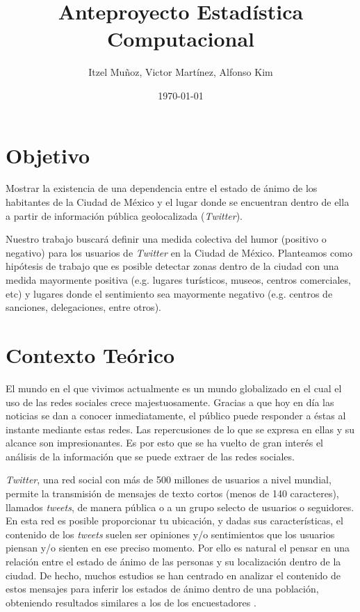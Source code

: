 \documentclass{article}
\author{Itzel Muñoz, Victor Martínez, Alfonso Kim}
\date{\today}
\title{Anteproyecto Estadística Computacional}
\begin{document}
\maketitle

	\section{Objetivo}
		Mostrar la existencia de una dependencia entre el estado de ánimo de los habitantes de la Ciudad de México y el lugar donde se encuentran dentro de ella a partir de información pública geolocalizada (\emph{Twitter}).

		Nuestro trabajo buscará definir una medida colectiva del humor (positivo o negativo) para los usuarios de \emph{Twitter} en la Ciudad de México. Planteamos como hipótesis de trabajo que es posible detectar zonas dentro de la ciudad con una medida mayormente positiva (e.g. lugares turísticos, museos, centros comerciales, etc) y lugares donde el sentimiento sea mayormente negativo (e.g. centros de sanciones, delegaciones, entre otros). 


	\section{Contexto Teórico}
		El mundo en el que vivimos actualmente es un mundo globalizado en el cual el uso de las redes sociales crece majestuosamente. Gracias a que hoy en día las noticias se dan a conocer inmediatamente, el público puede responder a éstas al instante mediante estas redes. Las repercusiones de lo que se expresa en ellas y su alcance son impresionantes. Es por esto que se ha vuelto de gran interés el análisis de la información que se puede extraer de las redes sociales.

		\emph{Twitter}, una red social con más de 500 millones de usuarios a nivel mundial, permite la transmisión de mensajes de texto cortos (menos de 140 caracteres), llamados \emph{tweets}, de manera pública o a un grupo selecto de usuarios o seguidores. En esta red es posible proporcionar tu ubicación, y dadas sus características, el contenido de los \emph{tweets} suelen ser opiniones y/o sentimientos que los usuarios piensan y/o sienten en ese preciso momento. Por ello es natural el pensar en una relación entre el estado de ánimo de las personas y su localización dentro de la ciudad. De hecho, muchos estudios se han centrado en analizar el contenido de estos mensajes para inferir los estados de ánimo dentro de una población, obteniendo resultados similares a los de los encuestadores \cite{Oconnor, Bollen}.
\end{document}
